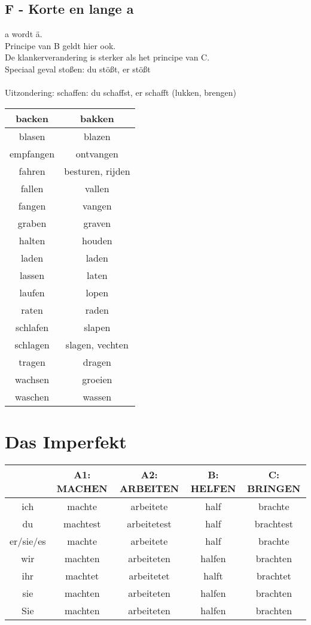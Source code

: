 \documentclass[main.tex]{subfiles}
\begin{document}
\subsection{F - Korte en lange a}
\begin{minipage}{0.5\textwidth}
a wordt ä.\\
Principe van B geldt hier ook.\\
De klankerverandering is sterker als het principe van C.\\
Speciaal geval stoßen: du stößt, er stößt\\
\\
Uitzondering: schaffen: du schaffst, er schafft		(lukken, brengen)
\end{minipage}
\begin{minipage}{0.5\textwidth}
\begin{tabular}{|c|c|}
\hline 
backen & bakken \\ 
\hline 
blasen & blazen \\ 
\hline 
empfangen & ontvangen \\ 
\hline 
fahren & besturen, rijden \\ 
\hline 
fallen & vallen \\ 
\hline 
fangen & vangen \\ 
\hline 
graben & graven \\ 
\hline 
halten & houden \\ 
\hline 
laden & laden \\ 
\hline 
lassen & laten \\ 
\hline 
laufen & lopen \\ 
\hline 
raten & raden \\ 
\hline 
schlafen & slapen \\ 
\hline 
schlagen & slagen, vechten \\ 
\hline 
tragen & dragen \\ 
\hline 
wachsen & groeien \\ 
\hline 
waschen & wassen \\ 
\hline 
\end{tabular} 
\end{minipage}

\section{Das Imperfekt}
\begin{tabular}{|c|c|c|c|c|}
\hline 
\rowcolor{gray}
\setlength\extrarowheight{5pt}
 & A1: MACHEN & A2: ARBEITEN & B: HELFEN & C: BRINGEN \\ 
\hline 
ich & machte & arbeitete & half & brachte \\ 
\hline 
du & machtest & arbeitetest & half & brachtest \\ 
\hline 
er/sie/es & machte & arbeitete & half & brachte \\ 
\hline 
wir & machten & arbeiteten & halfen & brachten \\ 
\hline 
ihr & machtet & arbeitetet & halft & brachtet \\ 
\hline 
sie & machten & arbeiteten & halfen & brachten \\ 
\hline 
Sie & machten & arbeiteten & halfen & brachten \\ 
\hline 
\end{tabular} 
\end{document}

